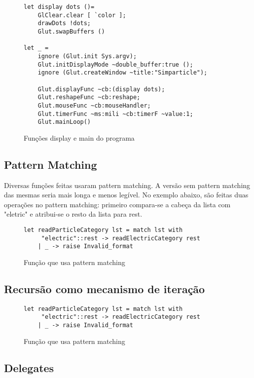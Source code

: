 \documentclass[a4paper,10pt]{article}
\begin{document}
	\begin{figure}[H]
	\centering	
	\begin{lstlisting}
let display dots ()=
	GlClear.clear [ `color ];
	drawDots !dots;
	Glut.swapBuffers ()
	
let _ = 
	ignore (Glut.init Sys.argv);
	Glut.initDisplayMode ~double_buffer:true ();
	ignore (Glut.createWindow ~title:"Simparticle");

	Glut.displayFunc ~cb:(display dots);
	Glut.reshapeFunc ~cb:reshape;
	Glut.mouseFunc ~cb:mouseHandler;
	Glut.timerFunc ~ms:mili ~cb:timerF ~value:1;
	Glut.mainLoop()
	\end{lstlisting}
	\caption{Funções display e main do programa}
\end{figure}
	
\subsection{Pattern Matching}

Diversas funções feitas usaram pattern matching. A versão sem pattern matching das mesmas seria mais longa e menos legível. No exemplo abaixo, são feitas duas operações no pattern matching: primeiro compara-se a cabeça da lista com "eletric" e atribui-se o resto da lista para rest.

\begin{figure}[H]
	\centering	
	\begin{lstlisting}
let readParticleCategory lst = match lst with
	 "electric"::rest -> readElectricCategory rest
	| _ -> raise Invalid_format
	\end{lstlisting}
	\caption{Função que usa pattern matching}
\end{figure}

\subsection{Recursão como mecanismo de iteração}

\begin{figure}[H]
	\centering	
	\begin{lstlisting}
let readParticleCategory lst = match lst with
	 "electric"::rest -> readElectricCategory rest
	| _ -> raise Invalid_format
	\end{lstlisting}
	\caption{Função que usa pattern matching}
\end{figure}
	
\subsection{Delegates}
	
\end{document}

